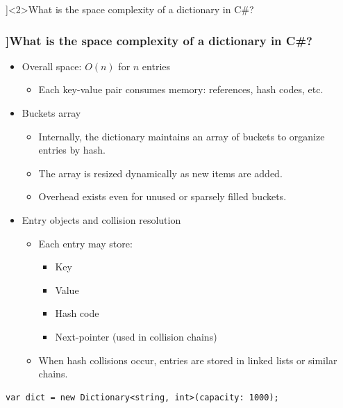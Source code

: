 \QuestionSlide[\CategoryBadge[CollColor!20]{Collections}]<2>{What is the space complexity of a dictionary in C\#?}
\begin{frame}[fragile]
  \frametitle{\AnswerTitle[\CategoryBadge[CollColor!20]{Collections}]{What is the space complexity of a dictionary in C\#?}}

{\footnotesize
\begin{itemize}
    \item Overall space: $O(n)$ for $n$ entries
    \begin{itemize}
        \item Each key-value pair consumes memory: references, hash codes, etc.
    \end{itemize}
    
    \item Buckets array
    \begin{itemize}
        \item Internally, the dictionary maintains an array of buckets to organize entries by hash.
        \item The array is resized dynamically as new items are added.
        \item Overhead exists even for unused or sparsely filled buckets.
    \end{itemize}
    
    \item Entry objects and collision resolution
    \begin{itemize}
        \item Each entry may store:
        \begin{itemize}
            \item Key
            \item Value
            \item Hash code
            \item Next-pointer (used in collision chains)
        \end{itemize}
        \item When hash collisions occur, entries are stored in linked lists or similar chains.
    \end{itemize}
\end{itemize}
}


  \begin{verbatim}
var dict = new Dictionary<string, int>(capacity: 1000);
  \end{verbatim}
\end{frame}

